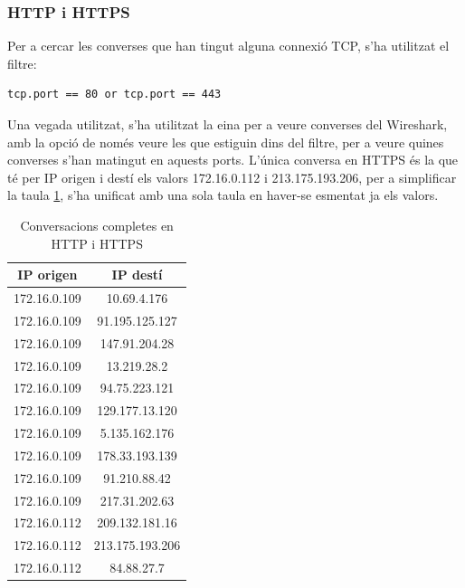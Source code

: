 \documentclass{article}
\begin{document}
\subsubsection{HTTP i HTTPS}
Per a cercar les converses que han tingut alguna connexió TCP, s'ha utilitzat
el filtre:
\begin{verbatim}
tcp.port == 80 or tcp.port == 443
\end{verbatim}
Una vegada utilitzat, s'ha utilitzat la eina per a veure converses del
Wireshark, amb la opció de només veure les que estiguin dins del filtre,
per a veure quines converses s'han matingut en aquests ports. L'única conversa
en HTTPS és la que té per IP origen i destí els valors 172.16.0.112 i 
213.175.193.206, per a simplificar la taula 
\ref{tcp:http}, s'ha unificat amb una sola taula
en haver-se esmentat ja els valors.
\begin{table}[!h]
\centering
\begin{tabular}{|c|c|}
\hline
IP origen &IP destí\\
\hline
172.16.0.109 &10.69.4.176\\
\hline
172.16.0.109 &91.195.125.127\\
\hline
172.16.0.109 &147.91.204.28\\
\hline
172.16.0.109 &13.219.28.2\\
\hline
172.16.0.109 &94.75.223.121\\
\hline
172.16.0.109 &129.177.13.120\\
\hline
172.16.0.109 &5.135.162.176\\
\hline
172.16.0.109 &178.33.193.139\\
\hline
172.16.0.109 &91.210.88.42\\
\hline
172.16.0.109 &217.31.202.63\\
\hline
172.16.0.112 &209.132.181.16\\
\hline
172.16.0.112 &213.175.193.206\\
\hline
172.16.0.112 &84.88.27.7\\
\hline
\end{tabular}
\caption{Conversacions completes en HTTP i HTTPS}
\label{tcp:http}
\end{table}
\end{document}
